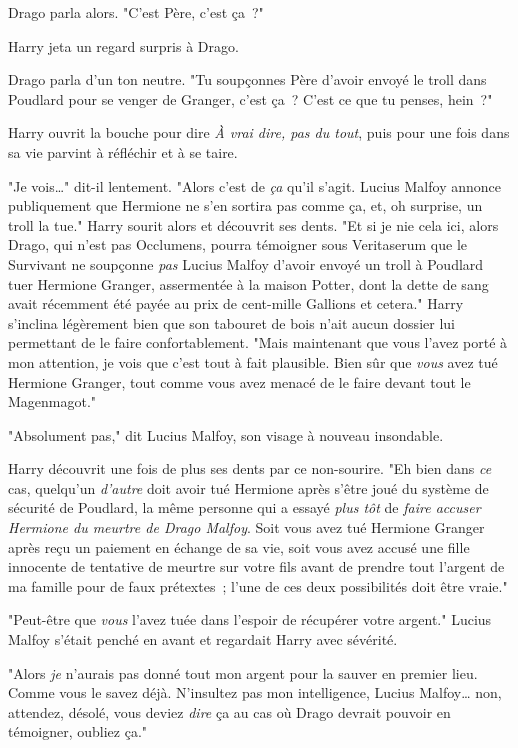 Drago parla alors. "C'est Père, c'est ça~?"

Harry jeta un regard surpris à Drago.

Drago parla d'un ton neutre. "Tu soupçonnes Père d'avoir envoyé le troll dans Poudlard pour se venger de Granger, c'est ça~? C'est ce que tu penses, hein~?"

Harry ouvrit la bouche pour dire \emph{À vrai dire, pas du tout}, puis pour une fois dans sa vie parvint à réfléchir et à se taire.

"Je vois…" dit-il lentement. "Alors c'est de \emph{ça} qu'il s'agit. Lucius Malfoy annonce publiquement que Hermione ne s'en sortira pas comme ça, et, oh surprise, un troll la tue." Harry sourit alors et découvrit ses dents. "Et si je nie cela ici, alors Drago, qui n'est pas Occlumens, pourra témoigner sous Veritaserum que le Survivant ne soupçonne \emph{pas} Lucius Malfoy d'avoir envoyé un troll à Poudlard tuer Hermione Granger, assermentée à la maison Potter, dont la dette de sang avait récemment été payée au prix de cent-mille Gallions et cetera." Harry s'inclina légèrement bien que son tabouret de bois n'ait aucun dossier lui permettant de le faire confortablement. "Mais maintenant que vous l'avez porté à mon attention, je vois que c'est tout à fait plausible. Bien sûr que \emph{vous} avez tué Hermione Granger, tout comme vous avez menacé de le faire devant tout le Magenmagot."

"Absolument pas," dit Lucius Malfoy, son visage à nouveau insondable.

Harry découvrit une fois de plus ses dents par ce non-sourire. "Eh bien dans \emph{ce} cas, quelqu'un \emph{d'autre} doit avoir tué Hermione après s'être joué du système de sécurité de Poudlard, la même personne qui a essayé \emph{plus tôt} de \emph{faire accuser Hermione du meurtre de Drago Malfoy}. Soit vous avez tué Hermione Granger après reçu un paiement en échange de sa vie, soit vous avez accusé une fille innocente de tentative de meurtre sur votre fils avant de prendre tout l'argent de ma famille pour de faux prétextes~; l'une de ces deux possibilités doit être vraie."

"Peut-être que \emph{vous} l'avez tuée dans l'espoir de récupérer votre argent." Lucius Malfoy s'était penché en avant et regardait Harry avec sévérité.

"Alors \emph{je} n'aurais pas donné tout mon argent pour la sauver en premier lieu. Comme vous le savez déjà. N'insultez pas mon intelligence, Lucius Malfoy… non, attendez, désolé, vous deviez \emph{dire} ça au cas où Drago devrait pouvoir en témoigner, oubliez ça."

